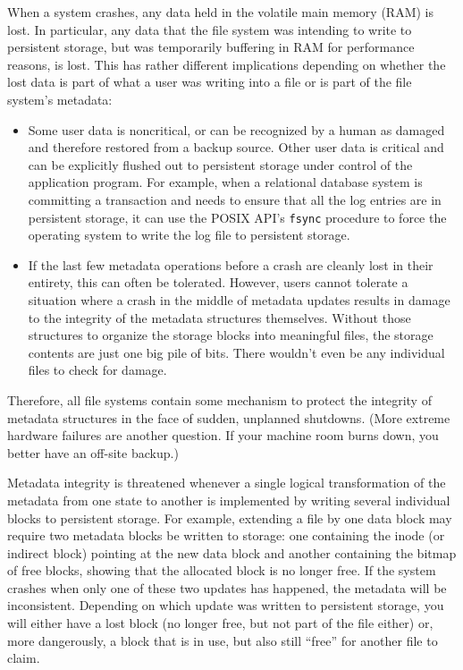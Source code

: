 When a system crashes, any data held in the volatile main memory (RAM)
is lost. In particular, any data that the file system was intending to
write to persistent storage, but was temporarily buffering in RAM for performance
reasons, is lost.  This has rather different implications depending on
whether the lost data is part of what a user was writing into a file
or is part of the file system's metadata:
\begin{itemize}
\item
Some user data is noncritical, or can be recognized by a human as
damaged and therefore restored from a backup source.  Other user data is critical and
can be explicitly flushed out to persistent storage under control of the application
program.  For example, when a relational database system is committing
a transaction and needs to ensure that all the log entries are in
persistent storage, it can use the POSIX API's \verb|fsync| procedure to force the
operating system to write the log file to persistent storage.
\item
If the last few metadata operations before a crash are
cleanly lost in their entirety, this can often be tolerated.  However,
users cannot tolerate a situation where a crash in the middle of metadata
updates results in damage to the integrity of the metadata structures
themselves.  Without those structures to organize the storage blocks into
meaningful files, the storage contents are just one big pile of bits.
There wouldn't even be any individual files to check for damage.
\end{itemize}
Therefore, all file systems contain some mechanism to protect the
integrity of metadata structures in the face of sudden, unplanned
shutdowns.  (More extreme hardware failures are another question.  If
your machine room burns down, you better have an off-site backup.)

Metadata integrity is threatened whenever a single logical
transformation of the metadata from one state to another is
implemented by writing several individual blocks to persistent storage.  For
example, extending a file by one data block may require two metadata
blocks be written to storage: one containing the inode (or indirect
block) pointing at the new data block and another containing the bitmap
of free blocks, showing that the allocated block is no longer free.
If the system crashes when only one of these two updates has happened,
the metadata will be inconsistent.  Depending on which update was
written to persistent storage, you will either have a lost block (no longer free, but
not part of the file either) or, more dangerously, a block that is in
use, but also still ``free'' for another file to claim.

